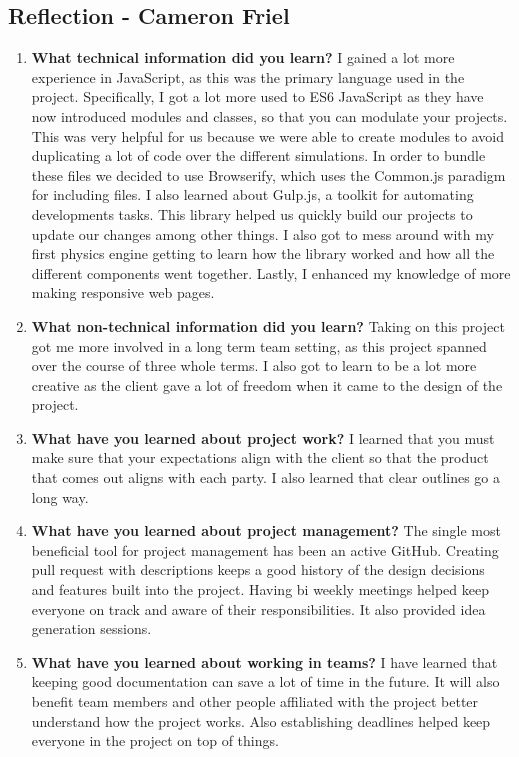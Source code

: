 \subsection{Reflection - Cameron Friel}

\begin{enumerate}
    \item \textbf{What technical information did you learn?} 
    I gained a lot more experience in JavaScript, as this was the primary language used in the project. Specifically, I got a lot more used to ES6 JavaScript as they have now introduced modules and classes, so that you can modulate your projects. This was very helpful for us because we were able to create modules to avoid duplicating a lot of code over the different simulations. In order to bundle these files we decided to use Browserify, which uses the Common.js paradigm for including files. I also learned about Gulp.js, a toolkit for automating developments tasks. This library helped us quickly build our projects to update our changes among other things. I also got to mess around with my first physics engine getting to learn how the library worked and how all the different components went together. Lastly, I enhanced my knowledge of more making responsive web pages.  
    
    \item \textbf{What non-technical information did you learn?} 
    Taking on this project got me more involved in a long term team setting, as this project spanned over the course of three whole terms. I also got to learn to be a lot more creative as the client gave a lot of freedom when it came to the design of the project.
    
    \item \textbf{What have you learned about project work?}
    I learned that you must make sure that your expectations align with the client so that the product that comes out aligns with each party. I also learned that clear outlines go a long way. 

    \item \textbf{What have you learned about project management?}
    The single most beneficial tool for project management has been an active GitHub. Creating pull request with descriptions keeps a good history of the design decisions and features built into the project. Having bi weekly meetings helped keep everyone on track and aware of their responsibilities. It also provided idea generation sessions.

    \item \textbf{What have you learned about working in teams?}
    I have learned that keeping good documentation can save a lot of time in the future. It will also benefit team members and other people affiliated with the project better understand how the project works. Also establishing deadlines helped keep everyone in the project on top of things.


\end{enumerate}
